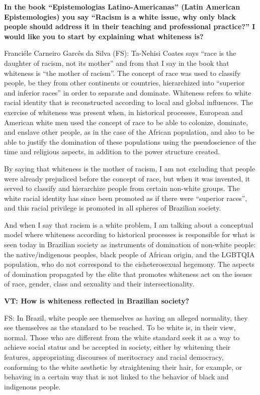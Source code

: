 \documentclass[a4paper,
fontsize=11pt,
oneside,
numbers=noperiodatend,
parskip=half-,
bibliography=totoc,
final
]{scrartcl}
\begin{document}
\textbf{In the book \enquote{Epistemologias Latino-Americanas} (Latin American
Epistemologies) you say \enquote{Racism is a white issue, why only black people
should address it in their teaching and professional practice?} I would
like you to start by explaining what whiteness is?}

Franciéle Carneiro Garcês da Silva (FS): Ta-Nehisi Coates says \enquote{race is
the daughter of racism, not its mother} and from that I say in the book
that whiteness is \enquote{the mother of racism}. The concept of race was used
to classify people, be they from other continents or countries,
hierarchized into \enquote{superior and inferior races} in order to separate and
dominate. Whiteness refers to white racial identity that is
reconstructed according to local and global influences. The exercise of
whiteness was present when, in historical processes, European and
American white men used the concept of race to be able to colonize,
dominate, and enslave other people, as in the case of the African
population, and also to be able to justify the domination of these
populations using the pseudoscience of the time and religious aspects,
in addition to the power structure created.

By saying that whiteness is the mother of racism, I am not excluding
that people were already prejudiced before the concept of race, but when
it was invented, it served to classify and hierarchize people from
certain non-white groups. The white racial identity has since been
promoted as if there were \enquote{superior races}, and this racial privilege is
promoted in all spheres of Brazilian society.

And when I say that racism is a white problem, I am talking about a
conceptual model where whiteness according to historical processes is
responsible for what is seen today in Brazilian society as instruments
of domination of non-white people: the native/indigenous peoples, black
people of African origin, and the LGBTQIA population, who do not
correspond to the cisheterosexual hegemony. The aspects of domination
propagated by the elite that promotes whiteness act on the issues of
race, gender, class and sexuality and their intersectionality.

\textbf{VT: How is whiteness reflected in Brazilian society?}

FS: In Brazil, white people see themselves as having an alleged
normality, they see themselves as the standard to be reached. To be
white is, in their view, normal. Those who are different from the white
standard seek it as a way to achieve social status and be accepted in
society, either by whitening their features, appropriating discourses of
meritocracy and racial democracy, conforming to the white aesthetic by
straightening their hair, for example, or behaving in a certain way that
is not linked to the behavior of black and indigenous people.
\end{document}
